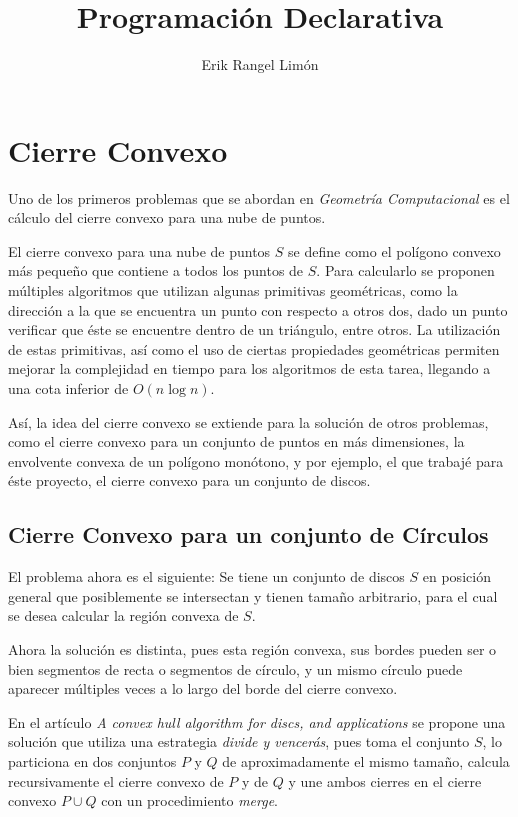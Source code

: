 \documentclass[12pt]{article}
\title{Programación Declarativa}
\author{Erik Rangel Limón}
\begin{document}

\maketitle

\section*{Cierre Convexo}

\noindent Uno de los primeros problemas que se abordan en \textit{Geometría Computacional} es el cálculo del cierre convexo para una nube de puntos.

El cierre convexo para una nube de puntos $S$ se define como el polígono convexo más pequeño que contiene a todos los puntos de $S$. Para calcularlo se proponen múltiples algoritmos que utilizan algunas primitivas geométricas, como la dirección a la que se encuentra un punto con respecto a otros dos, dado un punto verificar que éste se encuentre dentro de un triángulo, entre otros. La utilización de estas primitivas, así como el uso de ciertas propiedades geométricas permiten mejorar la complejidad en tiempo para los algoritmos de esta tarea, llegando a una cota inferior de $O(n\log n)$.

Así, la idea del cierre convexo se extiende para la solución de otros problemas, como el cierre convexo para un conjunto de puntos en más dimensiones, la envolvente convexa de un polígono monótono, y por ejemplo, el que trabajé para éste proyecto, el cierre convexo para un conjunto de discos.

\subsection*{Cierre Convexo para un conjunto de Círculos}

\noindent El problema ahora es el siguiente: Se tiene un conjunto de discos $S$ en posición general que posiblemente se intersectan y tienen tamaño arbitrario, para el cual se desea calcular la región convexa de $S$.

Ahora la solución es distinta, pues esta región convexa, sus bordes pueden ser o bien segmentos de recta o segmentos de círculo, y un mismo círculo puede aparecer múltiples veces a lo largo del borde del cierre convexo.

En el artículo \textit{A convex hull algorithm for discs, and applications} se propone una solución que utiliza una estrategia \textit{divide y vencerás}, pues toma el conjunto $S$, lo particiona en dos conjuntos $P$ y $Q$ de aproximadamente el mismo tamaño, calcula recursivamente el cierre convexo de $P$ y de $Q$ y une ambos cierres en el cierre convexo $P\cup Q$ con un procedimiento \textit{merge}.
\end{document}
